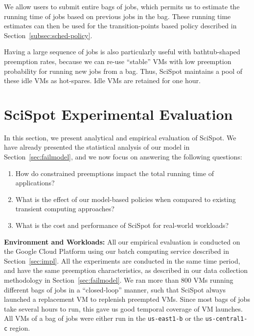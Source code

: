 \documentclass[compsoc]{IEEEtran}
\newcommand{\sysname}{SciSpot\xspace}
\newcommand{\subsecspace}[0]{-0.20cm}
\begin{document}
We allow users to submit entire bags of jobs, which permits us to estimate the running time of jobs based on previous jobs in the bag.
These running time estimates can then be used for the transition-points based policy described in Section~\ref{subsec:sched-policy}. 

Having a large sequence of jobs is also particularly useful with bathtub-shaped preemption rates, because we can re-use ``stable'' VMs with low preemption probability for running new jobs from a bag.
Thus, SciSpot maintains a pool of these idle VMs as hot-spares. 
Idle VMs are retained for one hour. 






















 
\vspace*{\subsecspace}
\section{SciSpot Experimental Evaluation}
\label{sec:eval}



In this section, we present analytical and empirical evaluation of \sysname.
We have already presented the statistical analysis of our model in Section~\ref{sec:failmodel}, and we now focus on answering the following questions: 

\begin{enumerate}
\item How do constrained preemptions impact the total running time of applications?

\item  What is the effect of our model-based policies when compared to existing transient computing approaches?


\item What is the cost and performance of \sysname for real-world workloads? 
  
\end{enumerate}


\noindent \textbf{Environment and Workloads:}
All our empirical evaluation is conducted on the Google Cloud Platform using our batch computing service described in Section~\ref{sec:impl}. 
All the experiments are conducted in the same time period, and have the same preemption characteristics, as described in our data collection methodology in  Section~\ref{sec:failmodel}.
We ran more than 800 VMs running different bags of jobs in a ``closed-loop'' manner, such that SciSpot always launched a replacement VM to replenish preempted VMs.
Since most bags of jobs take several hours to run, this gave us good temporal coverage of VM launches.
All VMs of a bag of jobs were either run in the \texttt{us-east1-b} or the  \texttt{us-central1-c} region. 
\end{document}
